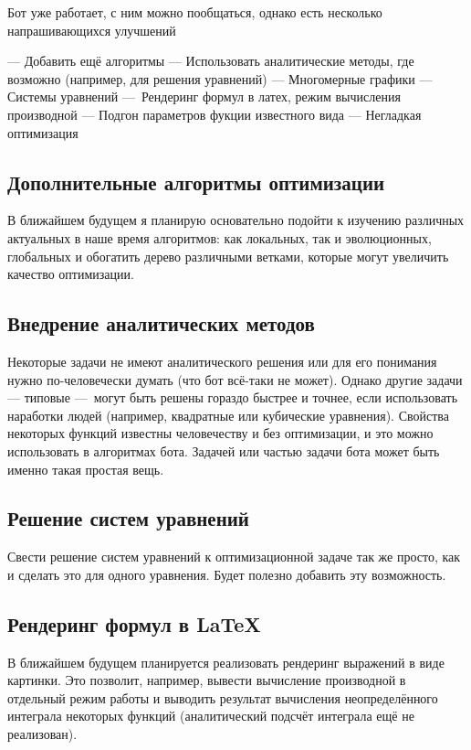 \documentclass[11pt]{article}
\begin{document}
    Бот уже работает, с ним можно пообщаться, однако есть несколько напрашивающихся улучшений

    — Добавить ещё алгоритмы
    — Использовать аналитические методы, где возможно (например, для решения уравнений)
    — Многомерные графики
    — Системы уравнений
    — Рендеринг формул в латех, режим вычисления производной
    — Подгон параметров фукции известного вида
    — Негладкая оптимизация

    \subsection{Дополнительные алгоритмы оптимизации}
    В ближайшем будущем я планирую основательно подойти к изучению различных актуальных в наше время алгоритмов:
    как локальных, так и эволюционных, глобальных и обогатить дерево различными ветками, которые могут увеличить качество оптимизации.

    \subsection{Внедрение аналитических методов}
    Некоторые задачи не имеют аналитического решения или для его понимания нужно по-человечески думать (что бот всё-таки не может).
    Однако другие задачи — типовые — могут быть решены гораздо быстрее и точнее, если использовать наработки людей (например, квадратные или кубические уравнения).
    Свойства некоторых функций известны человечеству и без оптимизации, и это можно использовать в алгоритмах бота.
    Задачей или частью задачи бота может быть именно такая простая вещь.

    \subsection{Решение систем уравнений}
    Свести решение систем уравнений к оптимизационной задаче так же просто, как и сделать это для одного уравнения.
    Будет полезно добавить эту возможность.

    \subsection{Рендеринг формул в \LaTeX}
    В ближайшем будущем планируется реализовать рендеринг выражений в виде картинки.
    Это позволит, например, вывести вычисление производной в отдельный режим работы
    и выводить результат вычисления неопределённого интеграла некоторых функций (аналитический подсчёт интеграла ещё не реализован).
\end{document}
